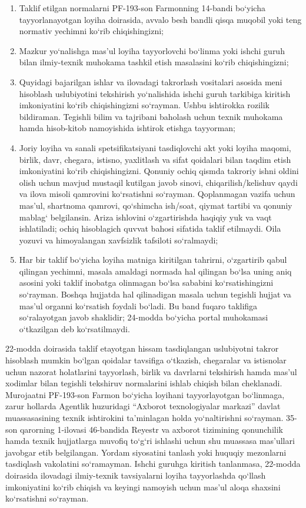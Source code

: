 \documentclass[14pt,a4paper]{extarticle}
\begin{document}
\begin{enumerate}[start=1]
\item Taklif etilgan normalarni PF-193-son Farmonning 14-bandi bo‘yicha tayyorlanayotgan loyiha doirasida, avvalo besh bandli qisqa muqobil yoki teng normativ yechimni ko‘rib chiqishingizni;
\item Mazkur yo‘nalishga mas’ul loyiha tayyorlovchi bo‘linma yoki ishchi guruh bilan ilmiy-texnik muhokama tashkil etish masalasini ko‘rib chiqishingizni;
\item Quyidagi bajarilgan ishlar va ilovadagi takrorlash vositalari asosida meni hisoblash uslubiyotini tekshirish yo‘nalishida ishchi guruh tarkibiga kiritish imkoniyatini ko‘rib chiqishingizni so‘rayman. Ushbu ishtirokka rozilik bildiraman. Tegishli bilim va tajribani baholash uchun texnik muhokama hamda hisob-kitob namoyishida ishtirok etishga tayyorman;
\item Joriy loyiha va sanali spetsifikatsiyani tasdiqlovchi akt yoki loyiha maqomi, birlik, davr, chegara, istisno, yaxlitlash va sifat qoidalari bilan taqdim etish imkoniyatini ko‘rib chiqishingizni. Qonuniy ochiq qismda takroriy ishni oldini olish uchun mavjud mustaqil kutilgan javob sinovi, chiqarilish/kelishuv qaydi va ilova misoli qamrovini ko‘rsatishni so‘rayman. Qoplanmagan vazifa uchun mas’ul, shartnoma qamrovi, qo‘shimcha ish/soat, qiymat tartibi va qonuniy mablag‘ belgilansin. Ariza ishlovini o‘zgartirishda haqiqiy yuk va vaqt ishlatiladi; ochiq hisoblagich quvvat bahosi sifatida taklif etilmaydi. Oila yozuvi va himoyalangan xavfsizlik tafsiloti so‘ralmaydi;
\item Har bir taklif bo‘yicha loyiha matniga kiritilgan tahrirni, o‘zgartirib qabul qilingan yechimni, masala amaldagi normada hal qilingan bo‘lsa uning aniq asosini yoki taklif inobatga olinmagan bo‘lsa sababini ko‘rsatishingizni so‘rayman. Boshqa hujjatda hal qilinadigan masala uchun tegishli hujjat va mas’ul organni ko‘rsatish foydali bo‘ladi. Bu band fuqaro taklifiga so‘ralayotgan javob shaklidir; 24-modda bo‘yicha portal muhokamasi o‘tkazilgan deb ko‘rsatilmaydi.
\end{enumerate}
22-modda doirasida taklif etayotgan hissam tasdiqlangan uslubiyotni takror hisoblash mumkin bo‘lgan qoidalar tavsifiga o‘tkazish, chegaralar va istisnolar uchun nazorat holatlarini tayyorlash, birlik va davrlarni tekshirish hamda mas’ul xodimlar bilan tegishli tekshiruv normalarini ishlab chiqish bilan cheklanadi. Murojaatni PF-193-son Farmon bo‘yicha loyihani tayyorlayotgan bo‘linmaga, zarur hollarda Agentlik huzuridagi “Axborot texnologiyalar markazi” davlat muassasasining texnik ishtirokini ta’minlagan holda yo‘naltirishni so‘rayman. 35-son qarorning 1-ilovasi 46-bandida Reyestr va axborot tizimining qonunchilik hamda texnik hujjatlarga muvofiq to‘g‘ri ishlashi uchun shu muassasa mas’ullari javobgar etib belgilangan. Yordam siyosatini tanlash yoki huquqiy mezonlarni tasdiqlash vakolatini so‘ramayman. Ishchi guruhga kiritish tanlanmasa, 22-modda doirasida ilovadagi ilmiy-texnik tavsiyalarni loyiha tayyorlashda qo‘llash imkoniyatini ko‘rib chiqish va keyingi namoyish uchun mas’ul aloqa shaxsini ko‘rsatishni so‘rayman.
\end{document}
